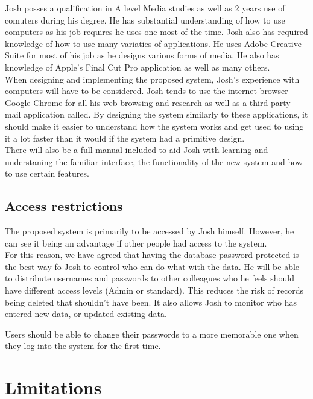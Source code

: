 Josh posses a qualification in A level Media studies as well as 2 years use of comuters during his degree. He has substantial understanding of how to use computers as his job requires he uses one most of the time. Josh also has required knowledge of how to use many variaties of applications. He uses Adobe Creative Suite for most of his job as he designs various forms of media. He also has knowledge of Apple's Final Cut Pro application as well as many others.\\

\noindent When designing and implementing the proposed system, Josh's experience with computers will have to be considered. Josh tends to use the internet browser Google Chrome for all his web-browsing and research as well as a third party mail application called. By designing the system similarly to these applications, it should make it easier to understand how the system works and get used to using it a lot faster than it would if the system had a primitive design.\\

\noindent There will also be a full manual included to aid Josh with learning and understaning the familiar interface, the functionality of the new system and how to use certain features.

\subsection{Access restrictions}

The proposed system is primarily to be accessed by Josh himself. However, he can see it being an advantage if other people had access to the system.\\

\noindent For this reason, we have agreed that having the database password protected is the best way fo Josh to control who can do what with the data. He will be able to distribute usernames and passwords to other colleagues who he feels should have different access levels (Admin or standard). This reduces the risk of records being deleted that shouldn't have been. It also allows Josh to monitor who has entered new data, or updated existing data.

\noindent Users should be able to change their passwords to a more memorable one when they log into the system for the first time.

\section{Limitations}


